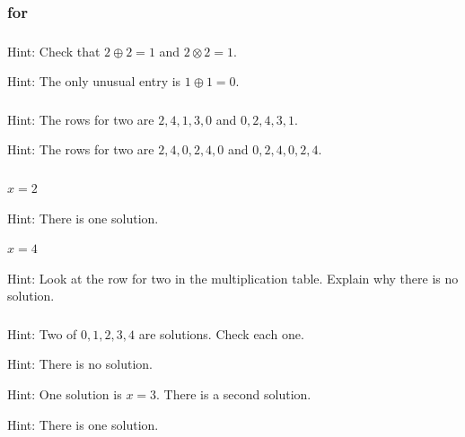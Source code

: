 \subsubsection{\answers for  \subzn}

\subsubsection*{ \answers}
\begin{apart}
    \item Hint: Check that $2 \oplus 2 = 1$ and $2 \otimes 2 = 1$.
    \item Hint: The only unusual entry is $1 \oplus 1 = 0$.
\end{apart}

\subsubsection*{ \answers}
\begin{apart}
    \item Hint: The rows for two are $2,4,1,3,0$ and $0,2,4,3,1$.
    \item Hint: The rows for two are $2,4,0,2,4,0$ and $0,2,4,0,2,4$.
\end{apart}

\subsubsection*{ \answers}
\begin{apart}
    \item $x=2$
    \item Hint: There is one solution.
    \item $x=4$
    \item Hint: Look at the row for two in the multiplication table. Explain why there is no solution.
\end{apart}

\subsubsection*{ \answers}
\begin{apart}
    \item Hint: Two of $0,1,2,3,4$ are solutions.  Check each one.
    \item Hint: There is no solution.
    \item Hint: One solution is $x=3$. There is a second solution.
    \item Hint: There is one solution.
\end{apart}

